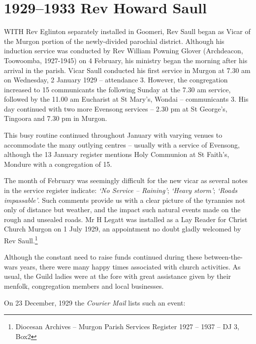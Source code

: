 \printendnotes[custom]
\setcounter{endnote}{0}
\chapter{1929--1933 Rev Howard Saull}
\nobalance


\lettrine[lines=3]{W}{ITH}
 Rev Eglinton separately installed in Goomeri, Rev Saull began as Vicar of the Murgon portion of the newly-divided parochial district. Although his induction service was conducted by Rev William Powning Glover (Archdeacon, Toowoomba, 1927-1945) on 4 February, his ministry began the morning after his arrival in the parish. Vicar Saull conducted his first service in Murgon at 7.30 am on Wednesday, 2 January 1929 -- attendance 3. However, the congregation increased to 15 communicants the following Sunday at the 7.30 am service, followed by the 11.00 am Eucharist at St Mary's, Wondai -- communicants 3. His day continued with two more Evensong services -- 2.30 pm at St George's, Tingoora and 7.30 pm in Murgon.

This busy routine continued throughout January with varying venues to accommodate the many outlying centres -- usually with a service of Evensong, although the 13 January register mentions Holy Communion at St Faith's, Mondure with a congregation of 15.



The month of February was seemingly difficult for the new vicar as several notes in the service register indicate: \emph{`No Service -- Raining'}; \emph{`Heavy storm'}; \emph{`Roads impassable'}. Such comments provide us with a clear picture of the tyrannies not only of distance but weather, and the impact such natural events made on the rough and unsealed roads. Mr H Legatt was installed as a Lay Reader for Christ Church Murgon on 1 July 1929, an appointment no doubt gladly welcomed by Rev Saull.\footnote{Diocesan Archives -- Murgon Parish Services Register 1927 -- 1937 -- DJ 3, Box2}


Although the constant need to raise funds continued during these between-the-wars years, there were many happy times associated with church activities. As usual, the Guild ladies were at the fore with great assistance given by their menfolk, congregation members and local businesses.



On 23 December, 1929 the \emph{Courier Mail} lists such an event:



